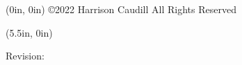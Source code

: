 
\textblockorigin{1in}{\paperheight-.85in}

\begin{textblock*}{2.5in}(0in, 0in)
\tiny
{\noindent\copyright 2022 Harrison Caudill
All Rights Reserved
}
\end{textblock*}

\begin{textblock*}{2.5in}(5.5in, 0in)
\tiny
    {\noindent
      \hfill
      Revision:
      
      \hspace{1in}
    }
\end{textblock*}
